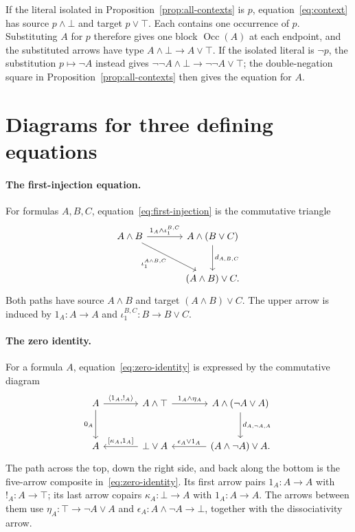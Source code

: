 \documentclass[11pt]{article}
\newcommand{\Occ}{\operatorname{Occ}}
\begin{document}
If the literal isolated in Proposition~\ref{prop:all-contexts}
is $p$, equation~\eqref{eq:context} has source $p\wedge\bot$ and
target $p\vee\top$. Each contains one occurrence of $p$. Substituting $A$ for $p$
therefore gives one block $\Occ(A)$ at each endpoint, and the
substituted arrows have type $A\wedge\bot\to A\vee\top$. If the isolated literal is $\neg p$,
the substitution $p\mapsto\neg A$ instead gives
$\neg\neg A\wedge\bot\to\neg\neg A\vee\top$; the
double-negation square in Proposition~\ref{prop:all-contexts}
then gives the equation for $A$.

\section{Diagrams for three defining equations}
\label{app:structural-diagrams}

\paragraph{The first-injection equation.}
For formulas $A,B,C$, equation~\eqref{eq:first-injection} is the
commutative triangle
\[
\begin{tikzcd}[column sep=large,row sep=large]
 A\wedge B
   \arrow[r,"1_A\wedge\iota_1^{B,C}"]
   \arrow[dr,"{\iota_1^{A\wedge B,C}}"']
   &A\wedge(B\vee C)\arrow[d,"d_{A,B,C}"]\\
   &(A\wedge B)\vee C.
\end{tikzcd}
\]
Both paths have source $A\wedge B$ and target $(A\wedge B)\vee C$.
The upper arrow is induced by $1_A:A\to A$ and
$\iota_1^{B,C}:B\to B\vee C$.

\paragraph{The zero identity.}
For a formula $A$, equation~\eqref{eq:zero-identity} is expressed by
the commutative diagram
\[
\begin{tikzcd}[column sep=large,row sep=large]
 A\arrow[r,"{\langle1_A,!_A\rangle}"]\arrow[d,"0_A"']
   &A\wedge\top\arrow[r,"1_A\wedge\eta_A"]
   &A\wedge(\neg A\vee A)\arrow[d,"d_{A,\neg A,A}"]\\
 A
   &\bot\vee A\arrow[l,"{[\kappa_A,1_A]}"']
   &(A\wedge\neg A)\vee A\arrow[l,"\epsilon_A\vee1_A"'].
\end{tikzcd}
\]
The path across the top, down the right side, and back along the
bottom is the five-arrow composite in~\eqref{eq:zero-identity}.
Its first arrow pairs $1_A:A\to A$ with $!_A:A\to\top$;
its last arrow copairs $\kappa_A:\bot\to A$ with $1_A:A\to A$.
The arrows between them use
$\eta_A:\top\to\neg A\vee A$ and
$\epsilon_A:A\wedge\neg A\to\bot$, together with the dissociativity arrow.
\end{document}
